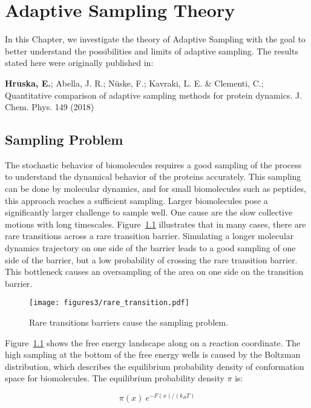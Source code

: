 \afterpage{\null\newpage}
\chapter{Adaptive Sampling Theory\label{ch:chapter3}}


In this Chapter, we investigate the theory of Adaptive Sampling with the goal to better understand the possibilities and limits of adaptive sampling. The results stated here were originally published in: 

\cite{Adstrategies2018} \textbf{Hruska, E.}; Abella, J. R.; N\"uske, F.;
Kavraki, L. E. \& Clementi, C.; Quantitative
comparison of adaptive sampling methods
for protein dynamics. J. Chem. Phys. 149 (2018) 

\section{Sampling Problem}

The stochastic behavior of biomolecules requires a good sampling of the process to understand the dynamical behavior of the proteins accurately. This sampling can be done by molecular dynamics, and for small biomolecules such as peptides, this approach reaches a sufficient sampling. Larger biomolecules pose a significantly larger challenge to sample well. One cause are the slow collective motions with long timescales. Figure~\ref{fig:raretransitions} illustrates that in many cases, there are rare transitions across a rare transition barrier. Simulating a longer molecular dynamics trajectory on one side of the barrier leads to a good sampling of one side of the barrier, but a low probability of crossing the rare transition barrier. This bottleneck causes an oversampling of the area on one side on the transition barrier.  

\begin{figure}[H]
  \centering
  \texttt{[image: figures3/rare\_transition.pdf]}
  \caption{Rare transitions barriers cause the sampling problem.}
  \label{fig:raretransitions}
\end{figure}

Figure~\ref{fig:raretransitions} shows the free energy landscape along on a reaction coordinate. The high sampling at the bottom of the free energy wells is caused by the Boltzman distribution, which describes the equilibrium probability density of conformation space for biomolecules. The equilibrium probability density $\pi$ is:

$$\pi(x)~e^{-F(x)/(k_{B}T)}$$

